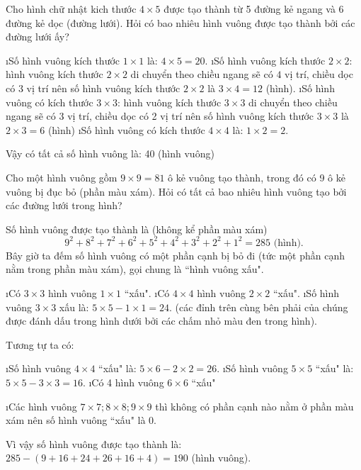 \begin{bt}
	Cho hình chữ nhật kich thước $4 \times 5$ được tạo thành từ 5 đường kẻ ngang và 6 đường kẻ dọc (đường lưới). Hỏi có bao nhiêu hình vuông được tạo thành bởi các đường lưới ấy?
	\begin{loigiaichuong34}
		\begin{enumerate}[--, leftmargin=*]
			\i Số hình vuông kích thước $1\times 1$  là: $4 \times 5 = 20$. 
			\i Số hình vuông kích thước  $2\times 2$: hình vuông kích thước $2\times 2$  di chuyển theo chiều ngang sẽ có $4$ vị trí, chiều dọc có $3$ vị trí nên số hình vuông kích thước $2\times 2$  là $3\times 4 = 12$  (hình).
			\i Số hình vuông có kích thước  $3\times 3$: hình vuông kích thước $3\times 3$  di chuyển theo chiều ngang sẽ có 3 vị trí, chiều dọc có 2 vị trí nên số hình vuông kích thước  $3\times 3$ là $2\times 3 = 6$ (hình)
			\i Số hình vuông có kích thước $4 \times 4$ là: $1\times 2 = 2$. 
		\end{enumerate}
		Vậy có tất cả số hình vuông là: 40 (hình vuông)
	\end{loigiaichuong34}
\end{bt}
\begin{bt}
	Cho một hình vuông gồm $9 \times 9 = 81$ ô kẻ vuông tạo thành, trong đó có 9 ô kẻ vuông bị đục bỏ (phần màu xám). Hỏi có tất cả bao nhiêu hình vuông tạo bởi các đường lưới trong hình?
	\begin{loigiaichuong34}
		Số hình vuông được tạo thành là (không kể phần màu xám)
		\[{9^2} + {8^2} + {7^2} + {6^2} + {5^2} + {4^2} + {3^2} + {2^2} + {1^2} = 285 \text{ (hình).}\]
		Bây giờ ta đếm số hình vuông có một phần cạnh bị bỏ đi (tức một phần cạnh nằm trong phần màu xám), gọi chung là ``hình vuông xấu".
		\begin{enumerate}[--, leftmargin=*]
			\i Có $3\times3$  hình vuông $1\times 1$  ``xấu".
			\i Có $4\times4$  hình vuông $2\times 2$  ``xấu".
			\i Số hình vuông $3\times 3$  xấu là: $5\times 5 - 1\times 1 = 24$. (các đỉnh trên cùng bên phải của chúng được đánh dấu trong hình dưới bởi các chấm nhỏ màu đen trong hình).
		\end{enumerate}
		Tương tự ta có: 
		\begin{enumerate}[--, leftmargin=*]
			\i Số hình vuông $4\times 4$  ``xấu" là: $5 \times 6 - 2 \times 2 = 26$.  
			\i Số hình vuông $5 \times 5$  ``xấu" là: $5 \times 5 - 3\times 3 = 16$. 
			\i Có 4 hình vuông $6 \times 6$  ``xấu"
			
			\i Các hình vuông $7\times7; 8\times 8; 9\times 9$ thì không có phần cạnh nào nằm ở phần màu xám nên số hình vuông ``xấu" là 0.
		\end{enumerate}
		Vì vậy số hình vuông được tạo thành là: $285 - \left( {9 + 16 + 24 + 26 + 16 + 4} \right) = 190$  (hình vuông).
	\end{loigiaichuong34}
\end{bt}
